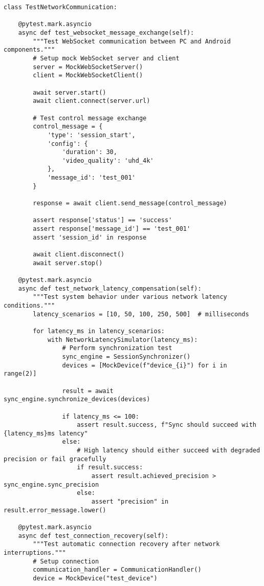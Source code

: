 \documentclass[12pt,a4paper]{article}
\begin{document}
\begin{verbatim}
class TestNetworkCommunication:
    
    @pytest.mark.asyncio
    async def test_websocket_message_exchange(self):
        """Test WebSocket communication between PC and Android components."""
        # Setup mock WebSocket server and client
        server = MockWebSocketServer()
        client = MockWebSocketClient()
        
        await server.start()
        await client.connect(server.url)
        
        # Test control message exchange
        control_message = {
            'type': 'session_start',
            'config': {
                'duration': 30,
                'video_quality': 'uhd_4k'
            },
            'message_id': 'test_001'
        }
        
        response = await client.send_message(control_message)
        
        assert response['status'] == 'success'
        assert response['message_id'] == 'test_001'
        assert 'session_id' in response
        
        await client.disconnect()
        await server.stop()
    
    @pytest.mark.asyncio
    async def test_network_latency_compensation(self):
        """Test system behavior under various network latency conditions."""
        latency_scenarios = [10, 50, 100, 250, 500]  # milliseconds
        
        for latency_ms in latency_scenarios:
            with NetworkLatencySimulator(latency_ms):
                # Perform synchronization test
                sync_engine = SessionSynchronizer()
                devices = [MockDevice(f"device_{i}") for i in range(2)]
                
                result = await sync_engine.synchronize_devices(devices)
                
                if latency_ms <= 100:
                    assert result.success, f"Sync should succeed with {latency_ms}ms latency"
                else:
                    # High latency should either succeed with degraded precision or fail gracefully
                    if result.success:
                        assert result.achieved_precision > sync_engine.sync_precision
                    else:
                        assert "precision" in result.error_message.lower()
    
    @pytest.mark.asyncio
    async def test_connection_recovery(self):
        """Test automatic connection recovery after network interruptions."""
        # Setup connection
        communication_handler = CommunicationHandler()
        device = MockDevice("test_device")
        

\end{verbatim}
\end{document}
